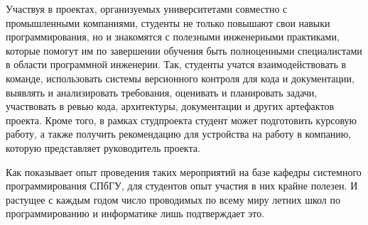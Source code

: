 \documentclass[a4paper]{article}
\begin{document}
Участвуя в проектах, организуемых университетами совместно с промышленными компаниями, студенты не только повышают свои навыки программирования, но и знакомятся с полезными инженерными практиками, которые помогут им по завершении обучения быть полноценными специалистами в области программной инженерии. Так, студенты учатся взаимодействовать в команде, использовать системы версионного контроля для кода и документации, выявлять и анализировать требования, оценивать и планировать задачи, участвовать в ревью кода, архитектуры, документации и других артефактов проекта. Кроме того, в рамках студпроекта студент может подготовить курсовую работу, а также получить рекомендацию для устройства на работу в компанию, которую представляет руководитель проекта. 

Как показывает опыт проведения таких мероприятий на базе кафедры системного программирования СПбГУ, для студентов опыт участия в них крайне полезен. И растущее с каждым годом число проводимых по всему миру летних школ по программированию и информатике лишь подтверждает это.
\end{document}
